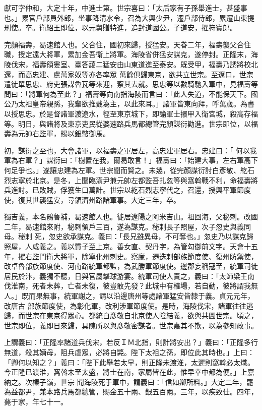 \begin{pinyinscope}
 獻可字仲和，大定十年，中進士第。世宗喜曰：「太后家有子孫舉進士，甚盛事也。」累官戶部員外郎，坐事降清水令，召為大興少尹，遷戶部侍郎，累遷山東提刑使。卒。衛紹王即位，以元舅贈特進，追封道國公。子道安，擢符寶郎。



 完顏福壽，曷速館人也。父合住，國初來歸，授猛安。天眷二年，福壽襲父合住職，授定遠大將軍，累加金吾衛上將軍。海陵省併猛安謀克，遂停封。正隆末，海陵伐宋，福壽領婁室、臺答藹二猛安由山東道進至泰安。既受甲，福壽乃誘將校北還，而高忠建、盧萬家奴等亦各率眾
 萬餘俱歸東京，欲共立世宗。至遼口，世宗遣徒單思忠、府吏張謀魯瓦等來迎，察其去就。思忠等以數騎馳入軍中，見福壽等問曰：「將軍何為至此？」福壽等向南指海陵而言曰：「此人失道，不能保天下。國公乃太祖皇帝親孫，我輩欲推戴為主，以此來耳。」諸軍皆東向拜，呼萬歲。為書以授思忠。於是督諸軍渡遼水，徑至東京城下，即諭軍士擐甲入衛宮城，殺高存福等。明日，與諸將及東京吏民從婆速路兵馬都總管完顏謀衍勸進。世宗即位，以福壽為元帥右監軍，賜以銀幣御馬。



 初，謀衍之至也，大會諸軍，以福壽之軍居左，高忠建軍居右。忠建曰：「
 何以我軍為右軍？」謀衍曰：「樹置在我，爾曷敢言！」福壽曰：「始建大事，左右軍高下何足爭也。」遂讓忠建為左軍。世宗聞而賢之。未幾，從完顏謀衍討白彥敬、紇石烈志寧於北京。是冬，上聞臨潢尹兼元帥左都監吾扎忽等與窩斡戰不利，命福壽將兵進討。已敗賊，俘獲生口萬計。世宗以紇石烈志寧代之，召還，授興平軍節度使，復其世襲猛安，尋領濟州路諸軍事。大定三年，卒。



 獨吉義，本名鶻魯補，曷速館人也。徙居遼陽之阿米吉山。祖回海，父秘剌。改國二年，曷速館來附，秘剌領戶三百，遂為謀克。秘剌長子照屋，次子忽史與義同母。秘剌
 死，忽史欲承謀克。義曰：「長兄雖異母，不可奪也。」忽史乃以謀克歸照屋，人咸義之。義以質子至上京。善女直、契丹字，為管勾御前文字。天會十五年，擢右監門衛大將軍，除寧化州刺史。察廉，遷迭剌部族節度使、復州防禦使，改卓魯部族節度使、河南路統軍都監，為武勝軍節度使。邊郡妄稱寇至，統軍司徙居民於汴，義獨不聽，日與官屬擊球游宴。統軍司使人責之，義曰：「太師梁王南伐淮南，死者未葬，亡者未復，彼豈敢先發？此城中有榷場，若自動，彼將謂我無人。」既而果無事，統軍謝之，請以沿邊唐州等處諸軍猛安皆隸于義。貞元元年，改唐古
 部族節度使，為彰化軍，改利涉軍節度使。是時，海陵伐宋，諸軍往往逃歸，而世宗在東京得眾心。都統白彥敬自北京使人陰結義，欲與共圖世宗。頃之，世宗即位，義即日來歸，具陳所以與彥敬密謀者。世宗嘉其不欺，以為參知政事。



 上謂義曰：「正隆率諸道兵伐宋，若反ＩＭ北指，則計將安出？」義曰：「正隆多行無道，殺其嫡母，阻兵虐眾，必將自斃。陛下太祖之孫，即位此其時也。」上曰：「卿何以知之？」義曰：「陛下此舉若太早，則正隆未渡淮，太遲則窩斡必太熾。今正隆已渡淮，窩斡未至太盛，將士在南，家屬皆在此，惟早幸中都為便。」上嘉納之。次榛子嶺，世宗
 聞海陵死于軍中，謂義曰：「信如卿所料。」大定二年，罷為益都尹，兼本路兵馬都總管，賜金五十兩、銀五百兩。三年，以疾致仕。四年，薨于家，年七十一。




\end{pinyinscope}
